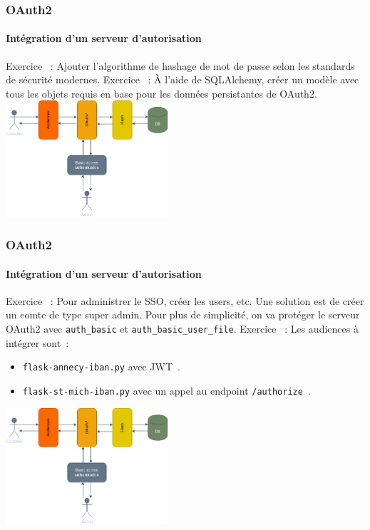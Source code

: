 \documentclass{beamer}
\begin{document}
    \begin{frame}
        \frametitle{OAuth2}
        \framesubtitle{Intégration d'un serveur d'autorisation}
        \transdissolve
        Exercice \execcounterdispinc{}~:
        Ajouter l'algorithme de hashage de mot de passe selon les standards de sécurité modernes.
        \bigbreak
        Exercice \execcounterdispinc{}~:
        À l'aide de SQLAlchemy, créer un modèle avec tous les objets requis en base pour les données persistantes de OAuth2.
        \bigbreak
        \centering
        \includegraphics[width=6cm]{image/OAuth2-integration.drawio}
    \end{frame}

    \begin{frame}
        \frametitle{OAuth2}
        \framesubtitle{Intégration d'un serveur d'autorisation}
        \transdissolve
        Exercice \execcounterdispinc{}~:
        Pour administrer le SSO, créer les users, etc.
        Une solution est de créer un comte de type super admin.
        Pour plus de simplicité, on va protéger le serveur OAuth2 avec \lstinline{auth_basic} et \lstinline{auth_basic_user_file}.
        \bigbreak
        Exercice \execcounterdispinc{}~:
        Les audiences à intégrer sont~:
        \begin{itemize}
            \item \lstinline{flask-annecy-iban.py} avec JWT~.
            \item \lstinline{flask-st-mich-iban.py} avec un appel au endpoint \lstinline{/authorize}~.
        \end{itemize}
        \bigbreak
        \centering
        \includegraphics[width=6cm]{image/OAuth2-integration.drawio}
    \end{frame}
\end{document}
